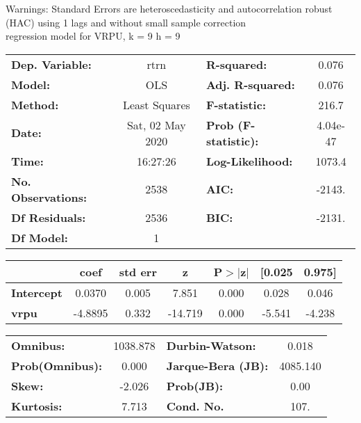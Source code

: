 Warnings: \newline
 [1] Standard Errors are heteroscedasticity and autocorrelation robust (HAC) using 1 lags and without small sample correction\\ 

regression model for VRPU, k = 9 h = 9\begin{center}
\begin{tabular}{lclc}
\toprule
\textbf{Dep. Variable:}    &       rtrn       & \textbf{  R-squared:         } &     0.076   \\
\textbf{Model:}            &       OLS        & \textbf{  Adj. R-squared:    } &     0.076   \\
\textbf{Method:}           &  Least Squares   & \textbf{  F-statistic:       } &     216.7   \\
\textbf{Date:}             & Sat, 02 May 2020 & \textbf{  Prob (F-statistic):} &  4.04e-47   \\
\textbf{Time:}             &     16:27:26     & \textbf{  Log-Likelihood:    } &    1073.4   \\
\textbf{No. Observations:} &        2538      & \textbf{  AIC:               } &    -2143.   \\
\textbf{Df Residuals:}     &        2536      & \textbf{  BIC:               } &    -2131.   \\
\textbf{Df Model:}         &           1      & \textbf{                     } &             \\
\bottomrule
\end{tabular}
\begin{tabular}{lcccccc}
                   & \textbf{coef} & \textbf{std err} & \textbf{z} & \textbf{P$> |$z$|$} & \textbf{[0.025} & \textbf{0.975]}  \\
\midrule
\textbf{Intercept} &       0.0370  &        0.005     &     7.851  &         0.000        &        0.028    &        0.046     \\
\textbf{vrpu}      &      -4.8895  &        0.332     &   -14.719  &         0.000        &       -5.541    &       -4.238     \\
\bottomrule
\end{tabular}
\begin{tabular}{lclc}
\textbf{Omnibus:}       & 1038.878 & \textbf{  Durbin-Watson:     } &    0.018  \\
\textbf{Prob(Omnibus):} &   0.000  & \textbf{  Jarque-Bera (JB):  } & 4085.140  \\
\textbf{Skew:}          &  -2.026  & \textbf{  Prob(JB):          } &     0.00  \\
\textbf{Kurtosis:}      &   7.713  & \textbf{  Cond. No.          } &     107.  \\
\bottomrule
\end{tabular}
\end{center}

